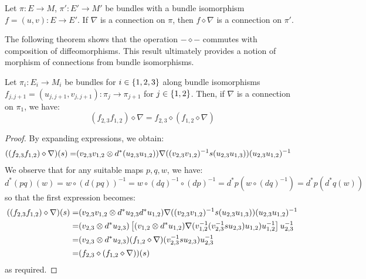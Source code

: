 \begin{thm}
Let $\pi : E \to M$, $\pi' : E' \to M'$ be bundles with a bundle isomorphism
$f = (u, v) : E \to E'$. If $\nabla$ is a connection on $\pi$, then
$f \diamond \nabla$ is a connection on $\pi'$.
\end{thm}

The following theorem shows that the operation $- \diamond -$ commutes with
composition of diffeomorphisms. This result ultimately provides a notion of
morphism of connections from bundle isomorphisms.
\begin{thm}
Let $\pi_i : E_i \to M_i$ be bundles
for $i \in \set{1, 2, 3}$ along
bundle isomorphisms
$f_{j, j + 1} = (u_{j, j+ 1}, v_{j, j + 1}) : \pi_{j} \to \pi_{j + 1}$
for $j \in \set{1, 2}$. Then, if $\nabla$ is a connection on $\pi_1$, we have:
\[
  (f_{2, 3}f_{1, 2}) \diamond \nabla
  = f_{2, 3} \diamond (f_{1, 2} \diamond \nabla)
\]
\end{thm}
\begin{proof}
By expanding expressions, we obtain:
\begin{align*}
((f_{2, 3}f_{1, 2}) \diamond \nabla)(s)
=& (v_{2,3}v_{1,2} \otimes d^*(u_{2,3}u_{1,2}))
   \nabla((v_{2, 3}v_{1, 2})^{-1}s(u_{2, 3}u_{1,3}))
   (u_{2,3}u_{1,2})^{-1}
\end{align*}
We observe that for any suitable maps $p, q, w$, we have:
\[
  d^*(pq)(w) = w \circ (d(pq))^{-1}
  = w \circ (dq)^{-1} \circ (dp)^{-1}
  = d^*p(w \circ (dq)^{-1})
  = d^*p(d^*q(w))
\]
so that the first expression becomes:
\begin{align*}
((f_{2, 3}f_{1, 2}) \diamond \nabla)(s)
=& (v_{2,3}v_{1,2} \otimes d^*u_{2,3}d^*u_{1,2})
   \nabla((v_{2, 3}v_{1, 2})^{-1}s(u_{2, 3}u_{1,3}))
   (u_{2,3}u_{1,2})^{-1} \\
=& (v_{2,3} \otimes d^*u_{2,3})\left[ (v_{1,2} \otimes d^*u_{1,2})
   \nabla(v_{1, 2}^{-1}(v_{2, 3}^{-1}su_{2, 3})u_{1,2})
   u_{1,2}^{-1} \right]u_{2,3}^{-1} \\
=& (v_{2,3} \otimes d^*u_{2,3})
   (f_{1,2} \diamond \nabla)(v_{2, 3}^{-1}su_{2, 3})
   u_{2,3}^{-1} \\
=& (f_{2,3} \diamond (f_{1,2} \diamond \nabla))(s)
\end{align*}
as required.
\end{proof}

